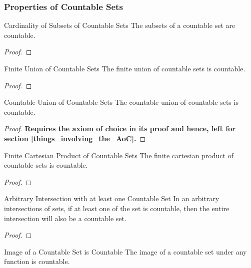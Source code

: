 \subsubsection{Properties of Countable Sets}
\begin{Theorem}{Cardinality of Subsets of Countable Sets}\label{cardinality_subset_countable_set}
    The subsets of a countable set are countable.
\end{Theorem}
\begin{proof}
    
\end{proof}
\begin{Theorem}{Finite Union of Countable Sets}\label{finite_union_countable_set}
    The finite union of countable sets is countable.
\end{Theorem}
\begin{proof}
    
\end{proof}
\begin{Theorem}{Countable Union of Countable Sets}\label{countable_union_countable_set}
    The countable union of countable sets is countable.
\end{Theorem}
\begin{proof}
    \textbf{Requires the axiom of choice in its proof and hence, left for section \eqref{things_involving_the_AoC}.}
\end{proof}
\begin{Theorem}{Finite Cartesian Product of Countable Sets}\label{finite_product_countable_set}
    The finite cartesian product of countable sets is countable.
\end{Theorem}
\begin{proof}
    
\end{proof}
\begin{Theorem}{Arbitrary Intersection with at least one Countable Set}\label{arbitrary_intersection_with_at_least_one_countable_set}
    In an arbitrary intersections of sets, if at least one of the set is countable, then the entire intersection will also be a countable set.
\end{Theorem}
\begin{proof}
    
\end{proof}
\begin{Theorem}{Image of a Countable Set is Countable}\label{image_of_a_countable_set_is_countable}
    The image of a countable set under any function is countable.
\end{Theorem}
